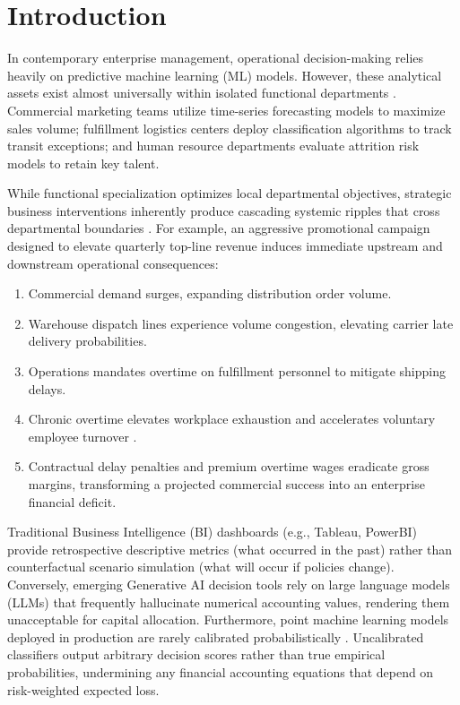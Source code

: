 \documentclass[conference]{IEEEtran}
\begin{document}
\section{Introduction}

In contemporary enterprise management, operational decision-making relies heavily on predictive machine learning (ML) models. However, these analytical assets exist almost universally within isolated functional departments \cite{pratt2019decision}. Commercial marketing teams utilize time-series forecasting models to maximize sales volume; fulfillment logistics centers deploy classification algorithms to track transit exceptions; and human resource departments evaluate attrition risk models to retain key talent.

While functional specialization optimizes local departmental objectives, strategic business interventions inherently produce cascading systemic ripples that cross departmental boundaries \cite{lee1997bullwhip}. For example, an aggressive promotional campaign designed to elevate quarterly top-line revenue induces immediate upstream and downstream operational consequences:
\begin{enumerate}
    \item Commercial demand surges, expanding distribution order volume.
    \item Warehouse dispatch lines experience volume congestion, elevating carrier late delivery probabilities.
    \item Operations mandates overtime on fulfillment personnel to mitigate shipping delays.
    \item Chronic overtime elevates workplace exhaustion and accelerates voluntary employee turnover \cite{maslach2001burnout}.
    \item Contractual delay penalties and premium overtime wages eradicate gross margins, transforming a projected commercial success into an enterprise financial deficit.
\end{enumerate}

Traditional Business Intelligence (BI) dashboards (e.g., Tableau, PowerBI) provide retrospective descriptive metrics (what occurred in the past) rather than counterfactual scenario simulation (what will occur if policies change). Conversely, emerging Generative AI decision tools rely on large language models (LLMs) that frequently hallucinate numerical accounting values, rendering them unacceptable for capital allocation. Furthermore, point machine learning models deployed in production are rarely calibrated probabilistically \cite{guo2017calibration}. Uncalibrated classifiers output arbitrary decision scores rather than true empirical probabilities, undermining any financial accounting equations that depend on risk-weighted expected loss.
\end{document}
